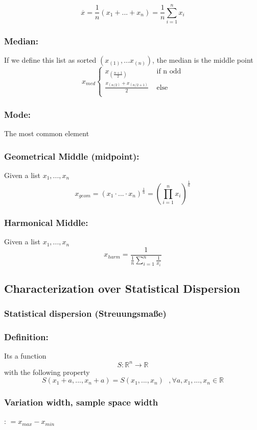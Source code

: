\documentclass{article}
\begin{document}
\[\overline{x} = \frac{1}{n}(x_1+...+x_n) = \frac{1}{n} \sum_{i=1}^{n}x_i\]

\subsubsection{Median: }
If we define this list as sorted $(x_{(1)},...x_{(n)})$, the median is the middle point
\[x_{med}\begin{cases}
  x_{(\frac{n+1}{2})} & \text{ if n odd}\\
  \frac{x_{(n/2)}  + x_{(n/2 + 1)}}{2} & \text{ else}\\
\end{cases}\]


\subsubsection{Mode: }
The most common element

\subsubsection{Geometrical Middle (midpoint): }Given a list $x_1,...,x_n$
\[x_{geom} = (x_1\cdot ... \cdot x_n)^{\frac{1}{n}} = (\prod_{i=1}^{n}x_i)^\frac{1}{n}\]

\subsubsection{Harmonical Middle: }Given a list $x_1,...,x_n$
\[ x_{harm} = \frac{1}{\frac{1}{n} \sum_{i=1}^n \frac{1}{x_i}}\]

\subsection{Characterization over Statistical Dispersion}

\subsubsection{Statistical dispersion (Streuungsmaße)}

\subsubsection{Definition: }Its a function
\[S : \mathbb{R}^n \to \mathbb{R}\] with the following property
\[S(x_1 + a , ... , x_n +a ) = S(x_1,...,x_n)  \text{    } ,  \forall a,x_1,...,x_n \in \mathbb{R}\]

\subsubsection{Variation width, sample space width}: $ = x_{max} - x_{min}$
\end{document}
